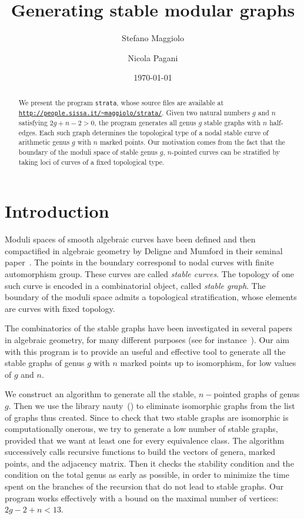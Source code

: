 \documentclass{amsart}
\title{Generating stable modular graphs}
\author{Stefano Maggiolo}
\author{Nicola Pagani}
\date{\today}
\theoremstyle{plain}
\theoremstyle{definition}
\begin{document}
\begin{abstract}
  We present the program \texttt{strata}, whose source files are
  available at \href{http://people.sissa.it/~maggiolo/strata/}
  {\texttt{http://people.sissa.it/\~{}maggiolo/strata/}}. Given two
  natural numbers $g$ and $n$ satisfying $2g+n-2>0$, the program
  generates all genus $g$ stable graphs with $n$ half-edges. Each such
  graph determines the topological type of a nodal stable curve of
  arithmetic genus $g$ with $n$ marked points. Our motivation comes
  from the fact that the boundary of the moduli space of stable genus
  $g$, $n$-pointed curves can be stratified by taking loci of curves
  of a fixed topological type.
\end{abstract}

\maketitle



\section{Introduction}
Moduli spaces of smooth algebraic curves have been defined and then
compactified in algebraic geometry by Deligne and Mumford in their
seminal paper~\cite{delignemumford}. The points in the boundary
correspond to nodal curves with finite automorphism group. These
curves are called \emph{stable curves}. The topology of one such curve
is encoded in a combinatorial object, called \emph{stable graph}. The
boundary of the moduli space admits a topological stratification,
whose elements are curves with fixed topology.

The combinatorics of the stable graphs have been investigated in
several papers in algebraic geometry, for many different purposes (see
for instance~\cite{modularoperads,opstall,opstall2,stephanie2}). Our
aim with this program is to provide an useful and effective tool to
generate all the stable graphs of genus $g$ with $n$ marked points up
to isomorphism, for low values of $g$ and $n$.

We construct an algorithm to generate all the stable, $n-$pointed
graphs of genus $g$. Then we use the library nauty~(\cite{nauty}) to
eliminate isomorphic graphs from the list of graphs thus
created. Since to check that two stable graphs are isomorphic is
computationally onerous, we try to generate a low number of stable
graphs, provided that we want at least one for every equivalence
class. The algorithm successively calls recursive functions to build
the vectors of genera, marked points, and the adjacency matrix. Then
it checks the stability condition and the condition on the total genus
as early as possible, in order to minimize the time spent on the
branches of the recursion that do not lead to stable graphs. Our
program works effectively with a bound on the maximal number of
vertices: $2g-2+n<13$.
\end{document}
